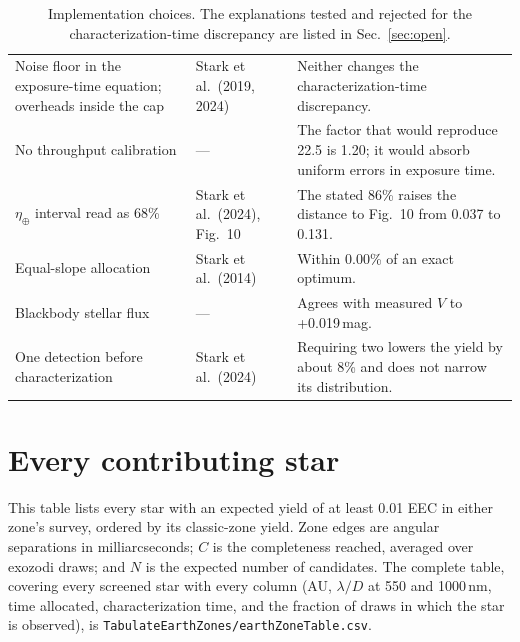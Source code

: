 \documentclass[11pt,a4paper]{article}
\begin{document}
\begin{table}[htbp]
\begin{tabular}{p{4.2cm}p{3.6cm}p{7.4cm}}
Noise floor in the exposure-time equation; overheads inside the cap & Stark et al.\ (2019, 2024) & Neither changes the characterization-time discrepancy. \\
No throughput calibration & --- & The factor that would reproduce 22.5 is 1.20; it would absorb uniform errors in exposure time. \\
$\eta_\oplus$ interval read as 68\% & Stark et al.\ (2024), Fig.~10 & The stated 86\% raises the distance to Fig.~10 from 0.037 to 0.131. \\
Equal-slope allocation & Stark et al.\ (2014) & Within 0.00\% of an exact optimum. \\
Blackbody stellar flux & --- & Agrees with measured $V$ to +0.019\,mag. \\
One detection before characterization & Stark et al.\ (2024) & Requiring two lowers the yield by about 8\% and does not narrow its distribution. \\
\bottomrule
\end{tabular}
\caption{Implementation choices. The explanations tested and rejected for the
characterization-time discrepancy are listed in Sec.~\ref{sec:open}.}
\label{tab:choices}
\end{table}

\clearpage
\section{Every contributing star}
\label{app:stars}

This table lists every star with an expected yield of at least 0.01 EEC in either
zone's survey, ordered by its classic-zone yield. Zone edges are angular separations in
milliarcseconds; $C$ is the completeness reached, averaged over exozodi draws; and $N$ is the
expected number of candidates. The complete table, covering every screened star with every column
(AU, $\lambda/D$ at 550 and 1000\,nm, time allocated, characterization time, and the fraction of
draws in which the star is observed), is \texttt{TabulateEarthZones/earthZoneTable.csv}.
\end{document}
